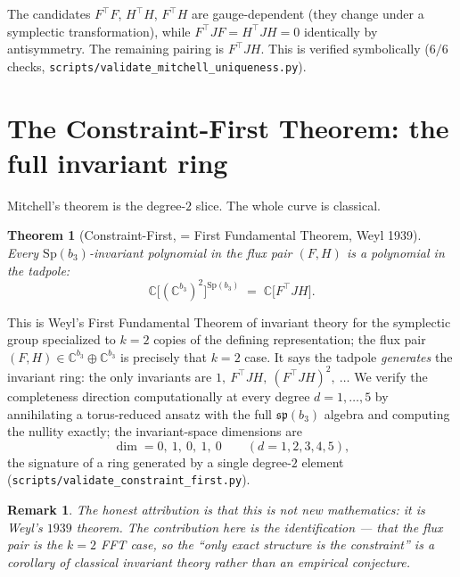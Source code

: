 \documentclass[11pt]{article}
\newtheorem{theorem}{Theorem}
\newtheorem{remark}{Remark}
\newcommand{\bthree}{b_3}
\newcommand{\flux}{F}
\newcommand{\hh}{H}
\begin{document}
The candidates $\flux^\top\flux$, $\hh^\top\hh$, $\flux^\top\hh$ are gauge-dependent
(they change under a symplectic transformation), while
$\flux^\top J\flux=\hh^\top J\hh=0$ identically by antisymmetry. The remaining
pairing is $\flux^\top J\hh$. This is verified symbolically ($6/6$ checks,
\texttt{scripts/validate\_mitchell\_uniqueness.py}).

\section{The Constraint-First Theorem: the full invariant ring}

Mitchell's theorem is the degree-$2$ slice. The whole curve is classical.

\begin{theorem}[Constraint-First, = First Fundamental Theorem, Weyl 1939]
Every $\mathrm{Sp}(\bthree)$-invariant polynomial in the flux pair $(\flux,\hh)$ is
a polynomial in the tadpole:
\begin{equation}
\mathbb{C}\bigl[(\mathbb{C}^{\bthree})^{2}\bigr]^{\mathrm{Sp}(\bthree)}
\;=\; \mathbb{C}\bigl[\flux^\top J \hh\bigr].
\end{equation}
\end{theorem}

This is Weyl's First Fundamental Theorem of invariant theory for the symplectic
group specialized to $k=2$ copies of the defining representation; the flux pair
$(\flux,\hh)\in\mathbb{C}^{\bthree}\oplus\mathbb{C}^{\bthree}$ is precisely that
$k=2$ case. It says the tadpole \emph{generates} the invariant ring: the only
invariants are $1,\ \flux^\top J\hh,\ (\flux^\top J\hh)^2,\ \dots$ We verify the
completeness direction computationally at every degree $d=1,\dots,5$ by annihilating
a torus-reduced ansatz with the full $\mathfrak{sp}(\bthree)$ algebra and computing
the nullity exactly; the invariant-space dimensions are
\begin{equation}
\dim = 0,\ 1,\ 0,\ 1,\ 0 \qquad (d=1,2,3,4,5),
\end{equation}
the signature of a ring generated by a single degree-$2$ element
(\texttt{scripts/validate\_constraint\_first.py}).

\begin{remark}
The honest attribution is that this is \emph{not new mathematics}: it is Weyl's
$1939$ theorem. The contribution here is the \emph{identification} --- that the flux
pair is the $k=2$ FFT case, so the ``only exact structure is the constraint'' is a
corollary of classical invariant theory rather than an empirical conjecture.
\end{remark}
\end{document}
